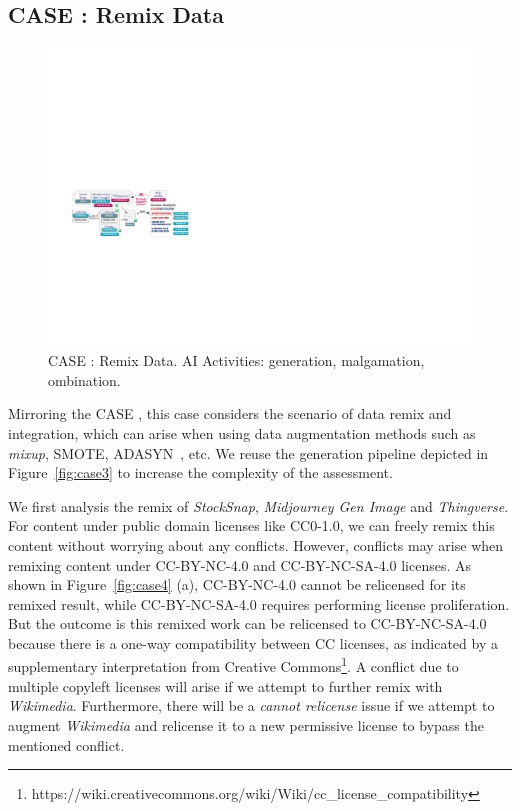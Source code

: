\subsection{CASE  : Remix Data}

\begin{figure}[h]
    \centering
    \includegraphics[width=\linewidth]{fig/case5.pdf}
    \caption{CASE : Remix Data. AI Activities: generation, malgamation, ombination.}
    \Description{}
    \label{fig:case5}
\end{figure}

Mirroring the CASE , this case considers the scenario of data remix and integration, which can arise when using data augmentation methods such as \textit{mixup}\cite{zhang2018mixup}, SMOTE\cite{chawla2002smote}, ADASYN~\cite{he2008adasyn}, etc.
We reuse the generation pipeline depicted in Figure~\ref{fig:case3} to increase the complexity of the assessment.

We first analysis the remix of \textit{StockSnap}, \textit{Midjourney Gen Image} and \textit{Thingverse}.
For content under public domain licenses like CC0-1.0, we can freely remix this content without worrying about any conflicts.
However, conflicts may arise when remixing content under CC-BY-NC-4.0 and CC-BY-NC-SA-4.0 licenses.
As shown in Figure~\ref{fig:case4} (a), CC-BY-NC-4.0 cannot be relicensed for its remixed result, while CC-BY-NC-SA-4.0 requires performing license proliferation.
But the outcome is this remixed work can be relicensed to CC-BY-NC-SA-4.0 because there is a one-way compatibility between CC licenses, as indicated by a supplementary interpretation from Creative Commons\footnote{https://wiki.creativecommons.org/wiki/Wiki/cc\_license\_compatibility}.
A conflict due to multiple copyleft licenses will arise if we attempt to further remix with \textit{Wikimedia}.
Furthermore, there will be a \textit{cannot relicense} issue if we attempt to augment \textit{Wikimedia} and relicense it to a new permissive license to bypass the mentioned conflict.

